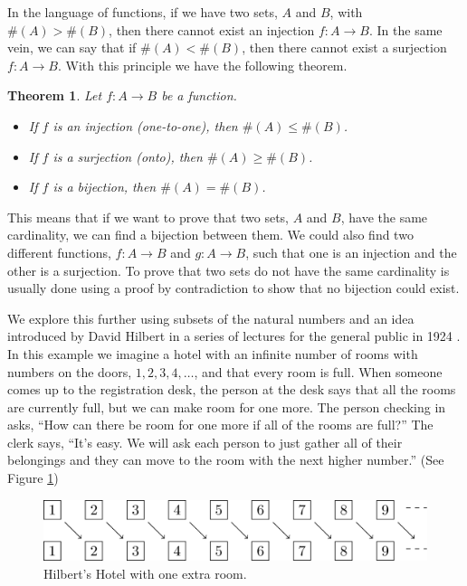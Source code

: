 \documentclass[
]{book}
\newtheorem{theorem}{Theorem}[chapter]
\theoremstyle{definition}
\theoremstyle{definition}
\theoremstyle{definition}
\theoremstyle{remark}
\begin{document}
In the language of functions, if we have two sets, \(A\) and \(B\), with \(\#(A)>\#(B)\), then there cannot exist an injection \(f:A\rightarrow B\). In the same vein, we can say that if \(\#(A) < \#(B)\), then there cannot exist a surjection \(f:A\rightarrow B\). With this principle we have the following theorem.

\begin{theorem}
\protect\hypertarget{thm:unnamed-chunk-146}{}{\label{thm:unnamed-chunk-146} }Let \(f:A\rightarrow B\) be a function.

\begin{itemize}
\item
  If \(f\) is an injection (one-to-one), then \(\#(A)\leq \#(B)\).
\item
  If \(f\) is a surjection (onto), then \(\#(A)\geq \#(B)\).
\item
  If \(f\) is a bijection, then \(\#(A) = \#(B)\).
\end{itemize}
\end{theorem}

This means that if we want to prove that two sets, \(A\) and \(B\), have the same cardinality, we can find a bijection between them. We could also find two different functions, \(f:A\rightarrow B\) and \(g:A\rightarrow B\), such that one is an injection and the other is a surjection. To prove that two sets do not have the same cardinality is usually done using a proof by contradiction to show that no bijection could exist.

We explore this further using subsets of the natural numbers and an idea introduced by David Hilbert in a series of lectures for the general public in 1924 \citep{Hilbert}. In this example we imagine a hotel with an infinite number of rooms with numbers on the doors, \(1, 2, 3, 4, \ldots\), and that every room is full. When someone comes up to the registration desk, the person at the desk says that all the rooms are currently full, but we can make room for one more. The person checking in asks, ``How can there be room for one more if all of the rooms are full?'' The clerk says, ``It's easy. We will ask each person to just gather all of their belongings and they can move to the room with the next higher number.'' (See Figure \ref{fig:hilbert1})

\begin{figure}

{\centering \includegraphics[width=1\linewidth]{tikz/Hilbert-Hotel} 

}

\caption{Hilbert's Hotel with one extra room.}\label{fig:hilbert1}
\end{figure}
\end{document}
